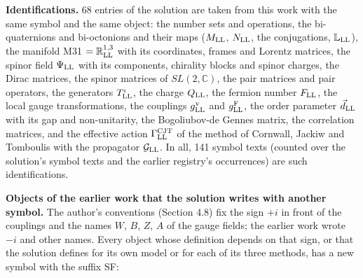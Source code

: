 \documentclass[
  10pt,
]{article}
\begin{document}
\textbf{Identifications.} 68 entries of the solution are taken from this
work with the same symbol and the same object: the number sets and
operations, the bi-quaternions and bi-octonions and their maps
(\(M_{\rm LL}\), \(N_{\rm LL}\), the conjugations,
\(\mathbb L_{\rm LL}\)), the manifold M31 \(=\mathbb R^{1,3}_{\rm LL}\)
with its coordinates, frames and Lorentz matrices, the spinor field
\(\Psi_{\rm LL}\) with its components, chirality blocks and spinor
charges, the Dirac matrices, the spinor matrices of \(SL(2,\mathbb C)\),
the pair matrices and pair operators, the generators
\(T^\iota_{\rm LL}\), the charge \(Q_{\rm LL}\), the fermion number
\(F_{\rm LL}\), the local gauge transformations, the couplings
\(g^{\rm v}_{\rm LL}\) and \(g^{\rm F}_{\rm LL}\), the order parameter
\(\vec d_{\rm LL}\) with its gap and non-unitarity, the Bogoliubov-de
Gennes matrix, the correlation matrices, and the effective action
\(\Gamma^{\rm CJT}_{\rm LL}\) of the method of Cornwall, Jackiw and
Tomboulis with the propagator \(\mathcal G_{\rm LL}\). In all, 141
symbol texts (counted over the solution's symbol texts and the earlier
registry's occurrences) are such identifications.

\textbf{Objects of the earlier work that the solution writes with
another symbol.} The author's conventions (Section 4.8) fix the sign
\(+i\) in front of the couplings and the names \(W\), \(B\), \(Z\),
\(A\) of the gauge fields; the earlier work wrote \(-i\) and other
names. Every object whose definition depends on that sign, or that the
solution defines for its own model or for each of its three methods, has
a new symbol with the suffix SF:
\end{document}

